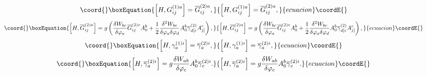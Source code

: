 \documentclass[a4paper,12pt]{article}
\begin{document}
\begin{equation}\coord{}\boxEquation{
\left[ H,G_{ij}^{(1)a}\right] =\overline{G}_{ij}^{(2)a},  \label{xx115}
}{
\left[ H,G_{ij}^{(1)a}\right] =\overline{G}_{ij}^{(2)a},  }{ecuacion}\coordE{}\end{equation}
\begin{equation}\coord{}\boxEquation{
\left[ H,\overline{G}_{ij}^{(2)a}\right] =g\left( \frac{\delta W_{bc}}{
\delta \varphi _{a}}\overline{G}_{ij}^{(2)c}A_{0}^{b}+\frac{1}{2}\frac{
\delta ^{2}W_{bc}}{\delta \varphi _{a}\delta \varphi _{d}}A_{0}^{b}\overline{
\gamma }_{d[i}^{(2)}A_{j]}^{c}\right) ,  \label{xx116}
}{
\left[ H,\overline{G}_{ij}^{(2)a}\right] =g\left( \frac{\delta W_{bc}}{
\delta \varphi _{a}}\overline{G}_{ij}^{(2)c}A_{0}^{b}+\frac{1}{2}\frac{
\delta ^{2}W_{bc}}{\delta \varphi _{a}\delta \varphi _{d}}A_{0}^{b}\overline{
\gamma }_{d[i}^{(2)}A_{j]}^{c}\right) ,  }{ecuacion}\coordE{}\end{equation}
\begin{equation}\coord{}\boxEquation{
\left[ H,\gamma _{a}^{(1)i}\right] =\overline{\gamma }_{a}^{(2)i},
\label{xx117}
}{
\left[ H,\gamma _{a}^{(1)i}\right] =\overline{\gamma }_{a}^{(2)i},
}{ecuacion}\coordE{}\end{equation}
\begin{equation}\coord{}\boxEquation{
\left[ H,\overline{\gamma }_{a}^{(2)i}\right] =g\frac{\delta W_{ab}}{\delta
\varphi _{c}}A_{0}^{b}\overline{\gamma }_{c}^{(2)i}.  \label{xx118}
}{
\left[ H,\overline{\gamma }_{a}^{(2)i}\right] =g\frac{\delta W_{ab}}{\delta
\varphi _{c}}A_{0}^{b}\overline{\gamma }_{c}^{(2)i}.  }{ecuacion}\coordE{}\end{equation}
\end{document}
